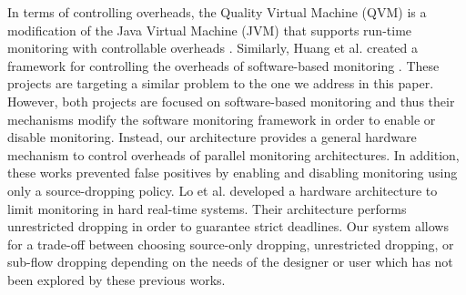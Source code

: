 In terms of controlling overheads, the Quality Virtual Machine (QVM) is a
modification of the Java Virtual Machine (JVM) that supports run-time
monitoring with controllable overheads \cite{qvm-oopsla08}. Similarly, Huang et
al. created a framework for controlling the overheads of software-based
monitoring \cite{huang-sttt12}. These projects are targeting a similar problem
to the one we address in this paper. However, both projects are focused on
software-based monitoring and thus their mechanisms modify the software
monitoring framework in order to enable or disable monitoring. Instead, our
architecture provides a general hardware mechanism to control overheads of
parallel monitoring architectures. In addition, these works prevented
false positives by enabling and disabling monitoring using only a source-dropping
policy. Lo et al. \cite{lo-rtas14} developed a hardware architecture to limit
monitoring in hard real-time systems. Their architecture performs unrestricted 
dropping in order to guarantee strict deadlines. Our system allows for a
trade-off between choosing source-only dropping, unrestricted dropping, or sub-flow 
dropping depending on the needs of the designer or user which has not been
explored by these previous works. 
